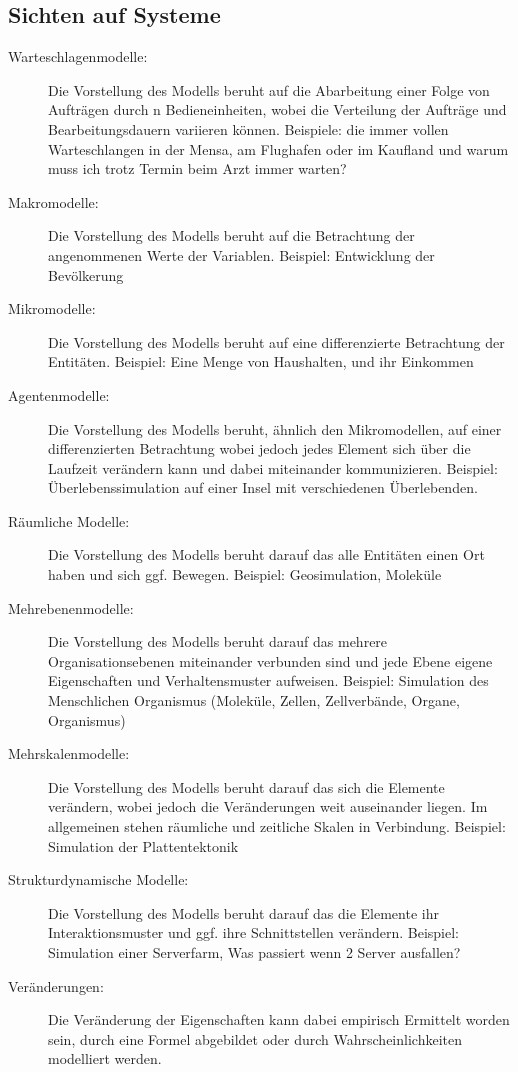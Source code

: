 \documentclass[11pt, fleqn, a4paper, leqno]{scrartcl} %
\begin{document}
	\subsection{Sichten auf Systeme}
	\begin{description}
		\item[Warteschlagenmodelle:]Die Vorstellung des Modells beruht auf die Abarbeitung einer Folge von Aufträgen durch n Bedieneinheiten, wobei die Verteilung der Aufträge und Bearbeitungsdauern variieren können. Beispiele: die immer vollen Warteschlangen in der Mensa, am Flughafen oder im Kaufland und warum muss ich trotz Termin beim Arzt immer warten?
		\item[Makromodelle:] Die Vorstellung des Modells beruht auf die Betrachtung der angenommenen Werte der Variablen. Beispiel: Entwicklung der Bevölkerung
		\item[Mikromodelle:] Die Vorstellung des Modells beruht auf eine differenzierte Betrachtung der Entitäten. Beispiel: Eine Menge von Haushalten, und ihr Einkommen
		\item[Agentenmodelle:] Die Vorstellung des Modells beruht, ähnlich den Mikromodellen, auf einer differenzierten Betrachtung wobei jedoch jedes Element sich über die Laufzeit verändern kann und dabei miteinander kommunizieren. Beispiel: Überlebenssimulation auf einer Insel mit verschiedenen Überlebenden.
		\item[Räumliche Modelle:] Die Vorstellung des Modells beruht darauf das alle Entitäten einen Ort haben und sich ggf. Bewegen. Beispiel: Geosimulation, Moleküle
		\item[Mehrebenenmodelle:] Die Vorstellung des Modells beruht darauf das mehrere Organisationsebenen miteinander verbunden sind und jede Ebene eigene Eigenschaften und Verhaltensmuster aufweisen. Beispiel: Simulation des Menschlichen Organismus (Moleküle, Zellen, Zellverbände, Organe, Organismus)
		\item[Mehrskalenmodelle:]  Die Vorstellung des Modells beruht darauf das sich die Elemente verändern, wobei jedoch die Veränderungen weit auseinander liegen. Im allgemeinen stehen räumliche und zeitliche Skalen in Verbindung. Beispiel: Simulation der Plattentektonik
		\item[Strukturdynamische Modelle:] Die Vorstellung des Modells beruht darauf das die Elemente ihr Interaktionsmuster und ggf. ihre Schnittstellen verändern. Beispiel: Simulation einer Serverfarm, Was passiert wenn 2 Server ausfallen?
		\item[Veränderungen:] Die Veränderung der Eigenschaften kann dabei empirisch Ermittelt worden sein, durch eine Formel abgebildet oder durch Wahrscheinlichkeiten modelliert werden.
	\end{description}
\end{document}
